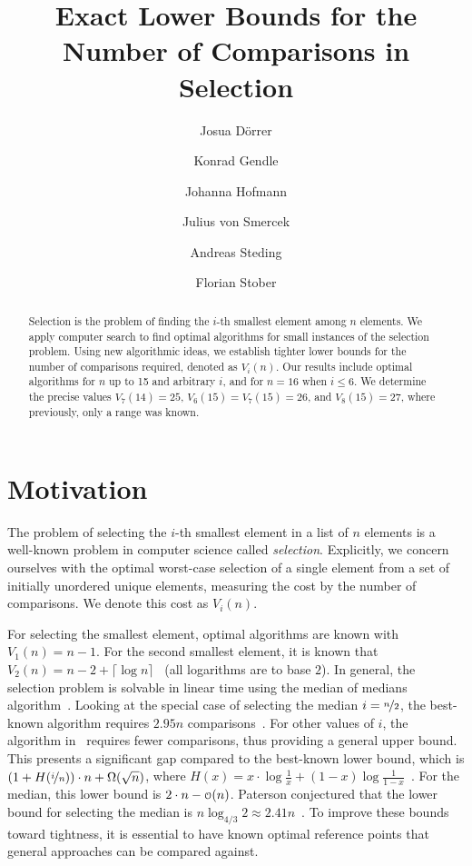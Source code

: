\documentclass[a4paper,UKenglish,cleveref, autoref, thm-restate, anonymous]{lipics-v2021}
\title{\Large Exact Lower Bounds for the Number of Comparisons in Selection}
\author{Josua Dörrer}{University Stuttgart}{}{}{}
\author{Konrad Gendle}{University Stuttgart}{}{}{}
\author{Johanna Hofmann}{University Stuttgart}{}{}{}
\author{Julius von Smercek}{University Stuttgart}{}{}{}
\author{Andreas Steding}{University Stuttgart}{}{}{}
\author{Florian Stober}{University Stuttgart}{}{}{}
\newcommand\smallO{
\mathchoice
{{\scriptstyle\mathcal{O}}}%
{{\scriptstyle\mathcal{O}}}%
{{\scriptscriptstyle\mathcal{O}}}%
{\scalebox{.50}{$\scriptscriptstyle\mathcal{O}$}}%
}
\begin{document}
\maketitle

\begin{abstract} \small\baselineskip=9pt
  Selection is the problem of finding the $i$-th smallest element among $n$ elements.
  We apply computer search to find optimal algorithms for small instances of the selection problem.
  Using new algorithmic ideas, we establish tighter lower bounds for the number of comparisons required, denoted as $V_i(n)$.
  Our results include optimal algorithms for $n$ up to 15 and arbitrary $i$, and for $n=16$ when $i \leq 6$.
  We determine the precise values $V_7(14) = 25$, $V_6(15) = V_7(15) = 26$, and $V_8(15) = 27$, where previously, only a range was known.

\end{abstract} %

\section{Motivation} \label{sec:motivation}

The problem of selecting the $i$-th smallest element in a list of $n$ elements is a well-known problem in computer science called \textit{selection}.
Explicitly, we concern ourselves with the optimal worst-case selection of a single element from a set of initially unordered unique elements, measuring the cost by the number of comparisons.
We denote this cost as $V_i(n)$.

For selecting the smallest element, optimal algorithms are known with $V_1(n) = n - 1$.
For the second smallest element, it is known that $V_2(n) = n - 2 + \lceil \log n\rceil$~\cite{Knuth1973} (all logarithms are to base $2$).
In general, the selection problem is solvable in linear time using the median of medians algorithm~\cite{Blum1972}.
Looking at the special case of selecting the median $i = \nicefrac{n}{2}$, the best-known algorithm requires $2.95n$ comparisons~\cite{dor1999selecting}.
For other values of $i$, the algorithm in~\cite{dor1999selecting} requires fewer comparisons, thus providing a general upper bound.
This presents a significant gap compared to the best-known lower bound, which is $\left (1 + H(\nicefrac{i}{n}) \right ) \cdot n + \Omega(\sqrt n)$, where $H(x) = x \cdot \log \frac{1}{x} + (1 - x) \log \frac{1}{1 - x}$~\cite{bent1985finding}.
For the median, this lower bound is $2 \cdot n - \smallO(n)$.
Paterson conjectured that the lower bound for selecting the median is $n \log_{4/3} 2 \approx 2.41n$~\cite{paterson1996progress}.
To improve these bounds toward tightness, it is essential to have known optimal reference points that general approaches can be compared against.
\end{document}
